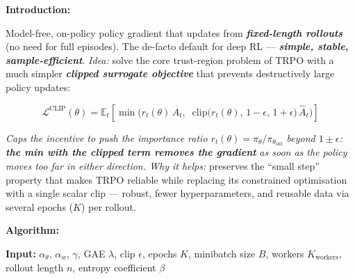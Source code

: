 \documentclass[11pt]{article}
\begin{document}
    \label{intro-4-7}

    \textbf{Introduction:}

Model-free, on-policy policy gradient that updates from
\textbf{\emph{fixed-length rollouts}} (no need for full episodes). The
de-facto default for deep RL --- \textbf{\emph{simple, stable,
sample-efficient}}. \emph{Idea:} solve the core trust-region problem of
TRPO with a much simpler \textbf{\emph{clipped surrogate objective}}
that prevents destructively large policy updates:

\[\mathcal{L}^{\text{CLIP}}(\theta) = \mathbb{E}_t\!\left[\min\bigl(r_t(\theta)\,\hat{A}_t,\;\; \mathrm{clip}\!\bigl(r_t(\theta),\, 1-\epsilon,\, 1+\epsilon\bigr)\,\hat{A}_t\bigr)\right]\]

\emph{Caps the incentive to push the importance ratio
\(r_t(\theta) = \pi_\theta/\pi_{\theta_\text{old}}\) beyond
\(1\pm\epsilon\):} \textbf{\emph{the min with the clipped term removes
the gradient}} \emph{as soon as the policy moves too far in either
direction. Why it helps:} preserves the ``small step'' property that
makes TRPO reliable while replacing its constrained optimisation with a
single scalar clip --- robust, fewer hyperparameters, and reusable data
via several epochs (\(K\)) per rollout.

    \textbf{Algorithm:}

\textbf{Input:} \(\alpha_\theta\), \(\alpha_w\), \(\gamma\), GAE
\(\lambda\), clip \(\epsilon\), epochs \(K\), minibatch size \(B\),
workers \(K_\text{workers}\), rollout length \(n\), entropy coefficient
\(\beta\)
\end{document}
